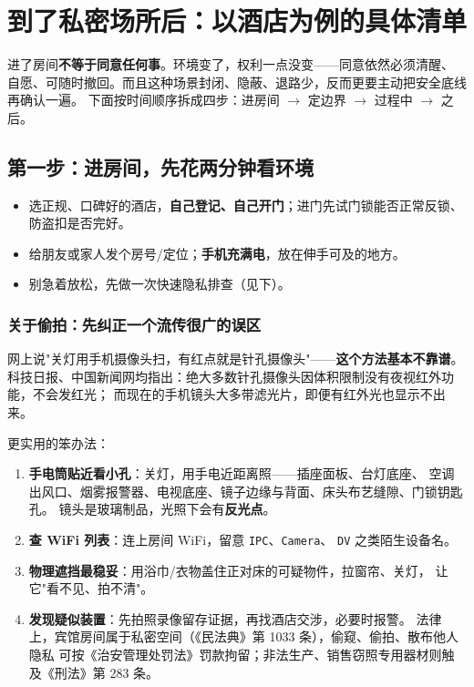 \chapter{到了私密场所后：以酒店为例的具体清单}
\label{chap:private}

进了房间\textbf{不等于同意任何事}。环境变了，权利一点没变——同意依然必须清醒、
自愿、可随时撤回。而且这种场景封闭、隐蔽、退路少，反而更要主动把安全底线再确认一遍。
下面按时间顺序拆成四步：进房间 $\to$ 定边界 $\to$ 过程中 $\to$ 之后。

\section{第一步：进房间，先花两分钟看环境}

\begin{itemize}[leftmargin=2em]
  \item 选正规、口碑好的酒店，\textbf{自己登记、自己开门}；进门先试门锁能否正常反锁、
        防盗扣是否完好。
  \item 给朋友或家人发个房号/定位；\textbf{手机充满电}，放在伸手可及的地方。
  \item 别急着放松，先做一次快速隐私排查（见下）。
\end{itemize}

\subsection*{关于偷拍：先纠正一个流传很广的误区}

网上说"关灯用手机摄像头扫，有红点就是针孔摄像头"——\textbf{这个方法基本不靠谱}。
科技日报、中国新闻网均指出：绝大多数针孔摄像头因体积限制没有夜视红外功能，不会发红光；
而现在的手机镜头大多带滤光片，即便有红外光也显示不出来。

更实用的笨办法：

\begin{enumerate}[leftmargin=2em,itemsep=0.3em]
  \item \textbf{手电筒贴近看小孔}：关灯，用手电近距离照——插座面板、台灯底座、
        空调出风口、烟雾报警器、电视底座、镜子边缘与背面、床头布艺缝隙、门锁钥匙孔。
        镜头是玻璃制品，光照下会有\textbf{反光点}。
  \item \textbf{查 WiFi 列表}：连上房间 WiFi，留意 \texttt{IPC}、\texttt{Camera}、
        \texttt{DV} 之类陌生设备名。
  \item \textbf{物理遮挡最稳妥}：用浴巾/衣物盖住正对床的可疑物件，拉窗帘、关灯，
        让它"看不见、拍不清"。
  \item \textbf{发现疑似装置}：先拍照录像留存证据，再找酒店交涉，必要时报警。
        法律上，宾馆房间属于私密空间（《民法典》第 1033 条），偷窥、偷拍、散布他人隐私
        可按《治安管理处罚法》罚款拘留；非法生产、销售窃照专用器材则触及《刑法》第 283 条。
\end{enumerate}

